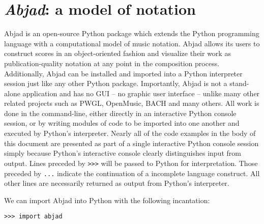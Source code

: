 \chapter{\emph{Abjad}: a model of notation}
\label{chap:a-model-of-notation}

Abjad\cite{baca2011xi, trevino2013compositional} is an open-source
Python\cite{vanrossum2003ys} package which extends the Python programming
language with a computational model of music notation. Abjad allows its users
to construct scores in an object-oriented fashion and visualize their work as
publication-quality notation at any point in the composition process.
Additionally, Abjad can be installed and imported into a Python interpreter
session just like any other Python package. Importantly, Abjad is not a
stand-alone application and has no GUI -- no graphic user interface -- unlike
many other related projects such as PWGL\cite{laurson2009qf,
kuuskankare2004recent}, OpenMusic\cite{assayag1999sw},
BACH\cite{agostini2013real} and many others. All work is done in the
command-line, either directly in an interactive Python console session, or by
writing modules of code to be imported into one another and executed by
Python's interpreter. Nearly all of the code examples in the body of this
document are presented as part of a single interactive Python console session
simply because Python's interactive console clearly distinguishes input from
output. Lines preceded by \texttt{>>>} will be passed to Python for
interpretation. Those preceded by \texttt{...} indicate the continuation of a
incomplete language construct. All other lines are necessarily returned as
output from Python's interpreter.

We can import Abjad into Python with the following incantation:

\begin{comment}
<abjad>
import abjad
</abjad>
\end{comment}

\begin{abjadbookoutput}
\begin{singlespacing}
\vspace{-0.5\baselineskip}
\begin{lstlisting}
>>> import abjad
\end{lstlisting}
\end{singlespacing}
\end{abjadbookoutput}

